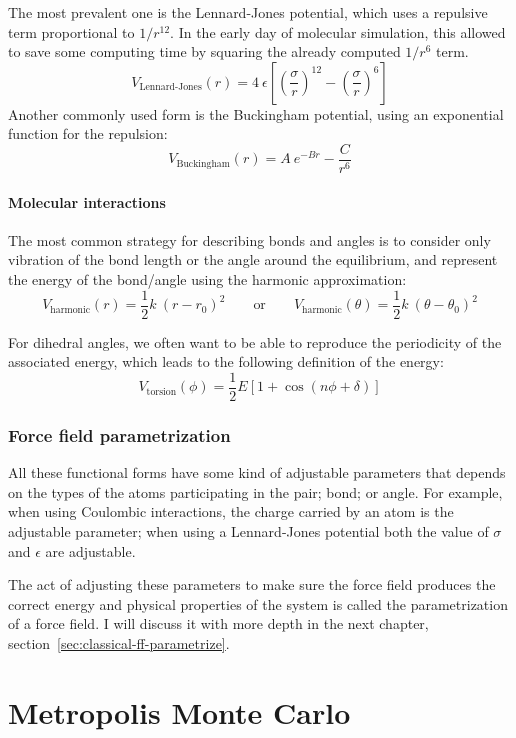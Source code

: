 \documentclass[thesis]{subfiles}
\begin{document}
The most prevalent one is the Lennard-Jones potential, which uses a repulsive
term proportional to $1/r^{12}$. In the early day of molecular simulation, this
allowed to save some computing time by squaring the already computed $1/r^6$ term.
\[V_\text{Lennard-Jones}(r) = 4 \ \epsilon \left[\left(\frac{\sigma}{r}\right)^{12} - \left(\frac{\sigma}{r}\right)^6\right]\]
Another commonly used form is the Buckingham potential, using an exponential
function for the repulsion:
\[V_\text{Buckingham}(r) = A \ e^{-B r} - \frac{C}{r^6}\]

\paragraph{Molecular interactions} The most common strategy for describing bonds
and angles is to consider only vibration of the bond length or the angle around
the equilibrium, and represent the energy of the bond/angle using the harmonic
approximation:
\[V_\text{harmonic}(r) = \frac 12 k \ (r - r_0)^2  \qquad\text{or}\qquad V_\text{harmonic}(\theta) = \frac 12 k \ (\theta - \theta_0)^2 \]

For dihedral angles, we often want to be able to reproduce the periodicity of
the associated energy, which leads to the following definition of the energy:
\[V_\text{torsion}(\phi) = \frac 12 E \left[1 + \cos(n \phi + \delta)\right] \]

\subsubsection{Force field parametrization}

All these functional forms have some kind of adjustable parameters that depends
on the types of the atoms participating in the pair; bond; or angle. For
example, when using Coulombic interactions, the charge carried by an atom is the
adjustable parameter; when using a Lennard-Jones potential both the value of
$\sigma$ and $\epsilon$ are adjustable.

The act of adjusting these parameters to make sure the force field produces the
correct energy and physical properties of the system is called the
parametrization of a force field. I will discuss it with more depth in the next
chapter, section~\ref{sec:classical-ff-parametrize}.

\section{Metropolis Monte Carlo}
\end{document}
